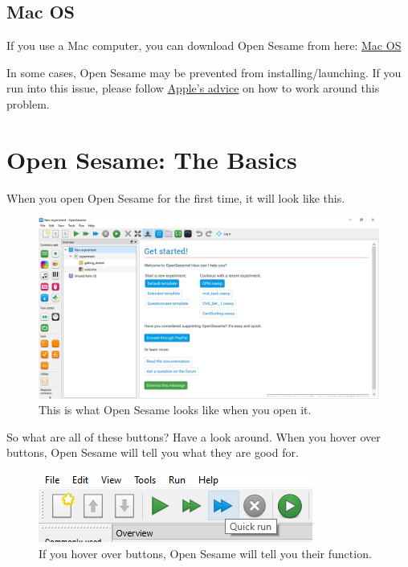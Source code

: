 \documentclass[
]{book}
\begin{document}
\hypertarget{mac-os}{%
\subsection{Mac OS}\label{mac-os}}

If you use a Mac computer, you can download Open Sesame from here:
\href{https://github.com/smathot/OpenSesame/releases/download/release\%2F3.2.8/opensesame_3.2.8-py2.7-macos-1.dmg}{Mac OS}

In some cases, Open Sesame may be prevented from installing/launching. If you run into this issue, please follow \href{https://support.apple.com/en-in/guide/mac-help/mh40616/mac}{Apple's advice} on how to work around this problem.

\hypertarget{open-sesame-the-basics}{%
\section{Open Sesame: The Basics}\label{open-sesame-the-basics}}

When you open Open Sesame for the first time, it will look like this.

\begin{figure}

{\centering \includegraphics[width=0.85\linewidth]{images/opensesame/OpenSesameopen} 

}

\caption{This is what Open Sesame looks like when you open it.}\label{fig:Figure12-2}
\end{figure}

So what are all of these buttons? Have a look around. When you hover over buttons, Open Sesame will tell you what they are good for.

\begin{figure}

{\centering \includegraphics[width=0.85\linewidth]{images/opensesame/hover} 

}

\caption{If you hover over buttons, Open Sesame will tell you their function.}\label{fig:Figure12-3}
\end{figure}
\end{document}
